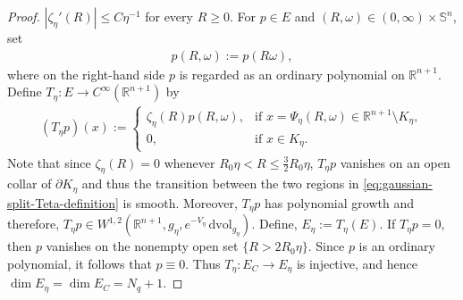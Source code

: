 \documentclass[11pt,reqno]{amsart}
\numberwithin{equation}{section}
\theoremstyle{definition}
\theoremstyle{remark}
\newcommand{\0}{\emptyset}
\newcommand{\bbR}{\mathbb R}
\newcommand{\bbS}{\mathbb S}
\newcommand{\dvol}{\,\mathrm{dvol}}
\begin{document}
\begin{proof}
$|\zeta_\eta'(R)|\leq C\eta^{-1}$ for every $R\geq0$. For $p\in E$ and
$(R,\omega)\in(0,\infty)\times\bbS^n$, set
\begin{align}
        p(R,\omega)
        :=
        p(R\omega),
\end{align}
where on the right-hand side $p$ is regarded as an ordinary polynomial
on $\bbR^{n+1}$. Define $T_\eta:E \rightarrow C^\infty(\bbR^{n+1})$ by
\begin{align}\label{eq:gaussian-split-Teta-definition}
        (T_\eta p)(x)
        :=
        \begin{cases}
        \zeta_\eta(R)p(R,\omega),
        &
        \text{if }
        x=\Psi_\eta(R,\omega)
        \in\bbR^{n+1}\setminus K_\eta,\\
        0,
        &
        \text{if }
        x\in K_\eta.
        \end{cases}
\end{align}
Note that since $\zeta_\eta(R)=0$ whenever $R_0\eta
        <
        R
        \leq
        \frac32R_0\eta$, $T_\eta p$ vanishes on an open collar of $\partial K_\eta$ and thus the transition between the two regions in \eqref{eq:gaussian-split-Teta-definition} is smooth. Moreover, $T_\eta p$ has polynomial growth and therefore, $T_\eta p \in W^{1,2}(\bbR^{n+1},g_\eta,e^{-V_\eta}\dvol_{g_\eta}).$ Define, $E_\eta:=T_\eta(E)$. If $T_\eta p=0$, then $p$ vanishes on the
nonempty open set $\{R>2R_0\eta\}$. Since $p$ is an ordinary polynomial,
it follows that $p\equiv0$. Thus $T_\eta:E_C\to E_\eta$ is injective, and
hence $\dim E_\eta = \dim E_C = N_q+1$. 


\end{proof}
\end{document}
